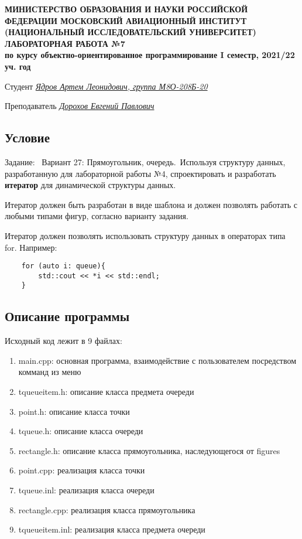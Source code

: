 \documentclass[12pt]{article}
\begin{document}
\begin{titlepage}
\begin{center}
\textbf{МИНИСТЕРСТВО ОБРАЗОВАНИЯ И НАУКИ РОССИЙСКОЙ ФЕДЕРАЦИИ
\medskip
МОСКОВСКИЙ АВИАЦИОННЫЙ ИНСТИТУТ
(НАЦИОНАЛЬНЫЙ ИССЛЕДОВАТЕЛЬСКИЙ УНИВЕРСИТЕТ)
\vfill\vfill
{\Huge ЛАБОРАТОРНАЯ РАБОТА №7} \\
по курсу объектно-ориентированное программирование
I семестр, 2021/22 уч. год}
\end{center}
\vfill

Студент \uline{\it {Ядров Артем Леонидович, группа М8О-208Б-20}\hfill}

Преподаватель \uline{\it {Дорохов Евгений Павлович}\hfill}

\vfill
\end{titlepage}

\subsection*{Условие}

Задание: \
Вариант 27: Прямоугольник, очередь.\
Используя структуру данных, разработанную для лабораторной работы №4, спроектировать и
разработать \textbf{итератор} для динамической структуры данных.


Итератор должен быть разработан в виде шаблона и должен позволять работать с любыми
типами фигур, согласно варианту задания.


Итератор должен позволять использовать структуру данных в операторах типа for. Например:
\begin{verbatim}
	for (auto i: queue){
		std::cout << *i << std::endl;
	}
\end{verbatim}

\subsection*{Описание программы}

Исходный код лежит в 9 файлах:
\begin{enumerate}
\item main.cpp: основная программа, взаимодействие с пользователем посредством комманд из меню

\item tqueueitem.h:    описание класса предмета очереди
\item point.h:     описание класса точки
\item tqueue.h:  описание класса очереди
\item rectangle.h: описание класса прямоугольника, наследующегося от figures
\item point.cpp:     реализация класса точки
\item tqueue.inl:  реализация класса очереди
\item rectangle.cpp: реализация класса прямоугольника
\item tqueueitem.inl:    реализация класса предмета очереди

\end{enumerate}
\end{document}
